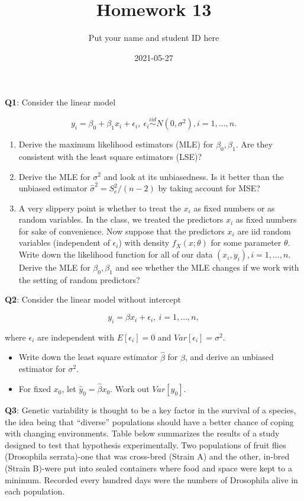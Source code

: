 \documentclass[]{article}
\title{Homework 13}
\author{Put your name and student ID here}
\date{2021-05-27}
\begin{document}
\maketitle

\textbf{Q1}: Consider the linear model

\[y_i=\beta_0+\beta_1x_i+\epsilon_i,\ \epsilon_i\stackrel{iid}{\sim} N(0,\sigma^2), i=1,\dots,n.\]

\begin{enumerate}
\def\labelenumi{\arabic{enumi}.}
\item
  Derive the maximum likelihood estimators (MLE) for
  \(\beta_0,\beta_1\). Are they consistent with the least square
  estimators (LSE)?
\item
  Derive the MLE for \(\sigma^2\) and look at its unbiasedness. Is it
  better than the unbiased estimator \(\hat\sigma^2 = S_e^2/(n-2)\) by
  taking account for MSE?
\item
  A very slippery point is whether to treat the \(x_i\) as fixed numbers
  or as random variables. In the class, we treated the predictors
  \(x_i\) as fixed numbers for sake of convenience. Now suppose that the
  predictors \(x_i\) are iid random variables (independent of
  \(\epsilon_i\)) with density \(f_X(x;\theta)\) for some parameter
  \(\theta\). Write down the likelihood function for all of our data
  \((x_i,y_i),i=1,\dots,n\). Derive the MLE for \(\beta_0,\beta_1\) and
  see whether the MLE changes if we work with the setting of random
  predictors?
\end{enumerate}

\textbf{Q2}: Consider the linear model without intercept

\[y_i  = \beta x_i+\epsilon_i,\ i=1,\dots,n,\]

where \(\epsilon_i\) are independent with \(E[\epsilon_i]=0\) and
\(Var[\epsilon_i]=\sigma^2\).

\begin{itemize}
\item
  Write down the least square estimator \(\hat \beta\) for \(\beta\),
  and derive an unbiased estimator for \(\sigma^2\).
\item
  For fixed \(x_0\), let \(\hat{y}_0=\hat\beta x_0\). Work out
  \(Var[\hat{y}_0]\).
\end{itemize}

\textbf{Q3}: Genetic variability is thought to be a key factor in the
survival of a species, the idea being that ``diverse'' populations
should have a better chance of coping with changing environments. Table
below summarizes the results of a study designed to test that hypothesis
experimentally. Two populations of fruit flies (Drosophila serrata)-one
that was cross-bred (Strain A) and the other, in-bred (Strain B)-were
put into sealed containers where food and space were kept to a minimum.
Recorded every hundred days were the numbers of Drosophila alive in each
population.
\end{document}

